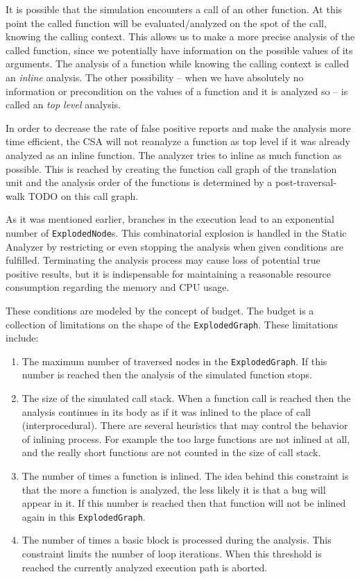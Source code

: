 It is possible that the simulation encounters a call of an other function.
At this point the called function will be evaluated/analyzed on the spot of the 
call, knowing the calling context. This allows us to make a more precise 
analysis of the called function, since we potentially have information on the 
possible values of its arguments. The analysis of a function while knowing the 
calling context is called an \textit{inline} analysis. The other possibility -- 
when we have absolutely no information or precondition on the values of a 
function and it is analyzed so -- is called an \textit{top level} analysis.

In order to decrease the rate of false positive reports and make the analysis 
more time efficient, the CSA will not reanalyze a function as top level if it 
was already analyzed as an inline function. The analyzer tries to inline as 
much function as possible. This is reached by creating the function call graph 
of the translation unit and the analysis order of the functions is determined 
by a post-traversal-walk TODO on this call graph.

As it was mentioned earlier, branches in the execution lead to an exponential number of \texttt{ExplodedNode}s.
This combinatorial explosion is handled in the Static Analyzer by restricting or even stopping
the analysis when given conditions are fulfilled. Terminating the analysis 
process may cause loss of potential true positive results, but it is 
indispensable for maintaining a reasonable resource consumption regarding the 
memory and CPU usage. 

These conditions are modeled by the concept of budget.
The budget is a collection of limitations on the shape of the \texttt{ExplodedGraph}.
These limitations include:
\begin{enumerate}  
	\item The maximum number of traversed nodes in the \texttt{ExplodedGraph}. 
	If 	this number is reached then the analysis of the simulated function stops.
	\item The size of the simulated call stack. When a function call is 
	reached then the analysis continues in its body as if it was inlined to the 
	place of call (interprocedural). There are several heuristics that may control 
	the	behavior of inlining process. For example the too large functions are 
	not	inlined at all, and the really short functions are not counted in the 
	size of	call stack.
	\item The number of times a function is inlined. The idea behind this
	constraint is that the more a function is analyzed, the less likely it 
	is that a 	bug will appear in it. If this number is reached then that 
	function will not be inlined again in this \texttt{ExplodedGraph}.
	\item The number of times a basic block is processed during the 
	analysis. This	constraint limits the number of loop iterations. When this 
	threshold is reached the currently analyzed execution path is aborted.
\end{enumerate}

